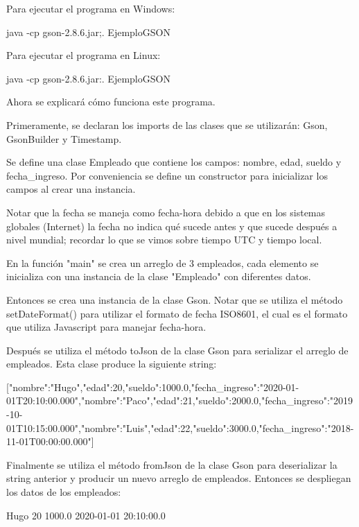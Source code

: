 Para ejecutar el programa en Windows:

\begin{SourceCode}
java -cp gson-2.8.6.jar;. EjemploGSON
\end{SourceCode}

Para ejecutar el programa en Linux:

\begin{SourceCode}
java -cp gson-2.8.6.jar:. EjemploGSON
\end{SourceCode}

Ahora se explicará cómo funciona este programa.

Primeramente, se declaran los imports de las clases que se utilizarán: Gson, GsonBuilder y Timestamp.

Se define una clase Empleado que contiene los campos: nombre, edad, sueldo y fecha\_ingreso. Por conveniencia se define un constructor para inicializar los campos al crear una instancia.

Notar que la fecha se maneja como fecha-hora debido a que en los sistemas globales (Internet) la fecha no indica qué sucede antes y que sucede después a nivel mundial; recordar lo que se vimos sobre tiempo UTC y tiempo local.

\begin{SourceCode}
En la función "main" se crea un arreglo de 3 empleados, cada elemento se inicializa con una instancia de la clase "Empleado" con diferentes datos.

Entonces se crea una instancia de la clase Gson. Notar que se utiliza el método setDateFormat() para utilizar el formato de fecha ISO8601, el cual es el formato que utiliza Javascript para manejar fecha-hora.

Después se utiliza el método toJson de la clase Gson para serializar el arreglo de empleados. Esta clase produce la siguiente string:

[{"nombre":"Hugo","edad":20,"sueldo":1000.0,"fecha_ingreso":"2020-01-01T20:10:00.000"},{"nombre":"Paco","edad":21,"sueldo":2000.0,"fecha_ingreso":"2019-10-01T10:15:00.000"},{"nombre":"Luis","edad":22,"sueldo":3000.0,"fecha_ingreso":"2018-11-01T00:00:00.000"}]

Finalmente se utiliza el método fromJson de la clase Gson para deserializar la string anterior y producir un nuevo arreglo de empleados. Entonces se despliegan los datos de los empleados:

Hugo 20 1000.0 2020-01-01 20:10:00.0
\end{SourceCode}

